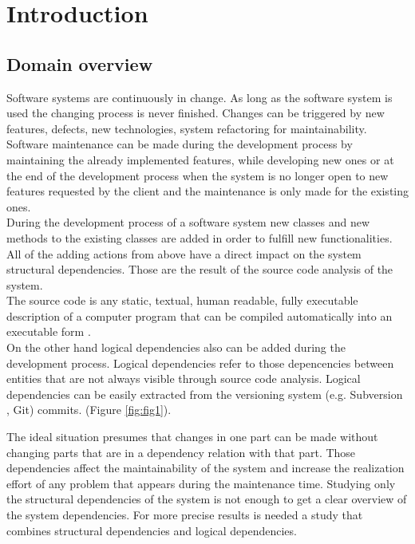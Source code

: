 \chapter{Introduction}

\section {Domain overview}

\tab Software systems are continuously in change. As long as the software system is used the changing process is never ﬁnished. Changes can be triggered by new features, defects, new technologies, system refactoring for maintainability.\\ Software maintenance can be made during the development process by maintaining the already implemented features, while developing new ones or at the end of the development process when the system is no longer open to new features requested by the client and the maintenance is only made for the existing ones.\\

\tab During the development process of a software system new classes and new methods to the existing classes are added in order to fulﬁll new functionalities. All of the adding actions from above have a direct impact on the system structural dependencies. Those are the result of the source code analysis of the system. \\The source code is any static, textual, human readable, fully executable description of a computer program that can be compiled automatically into an executable form \cite{ct1}.\\On the other hand logical dependencies also can be added during the development process. Logical dependencies refer to those depencencies between entities that are not always visible through source code analysis. Logical dependencies can be easily extracted from the versioning system (e.g. Subversion , Git) commits.  (Figure \ref{fig:fig1}).

\tab The ideal situation presumes that changes in one part can be made without changing parts that are in a dependency relation with that part. Those dependencies aﬀect the maintainability of the system and increase the realization eﬀort of any problem that appears during the maintenance time. Studying only the structural dependencies of the system is not enough to get a clear overview of the system dependencies. For more precise results is needed a study that combines structural dependencies and logical dependencies. 


